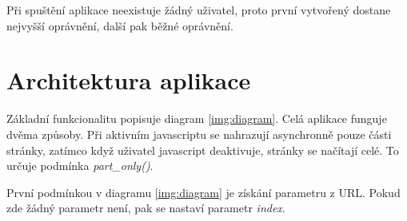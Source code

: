 \documentclass[a4paper]{article}
\begin{document}
		P\v{r}i spu\v{s}t\v{e}n\'i aplikace neexistuje \v{z}\'adn\'y u\v{z}ivatel, proto prvn\'i vytvo\v{r}en\'y
		dostane nejvy\v{s}\v{s}\'i opr\'avn\v{e}n\'i, dal\v{s}\'i pak b\v{e}\v{z}n\'e opr\'avn\v{e}n\'i.

		\clearpage
	\section{Architektura aplikace}
		Z\'akladn\'i funkcionalitu popisuje diagram \ref{img:diagram}. Cel\'a aplikace funguje dv\v{e}ma zp\r{u}\-so\-by.
		P\v{r}i aktivn\'im javascriptu se nahrazuj\'i asynchronn\v{e} pouze \v{c}\'asti str\'anky, zat\'imco kdy\v{z}
		u\v{z}ivatel javascript deaktivuje, str\'anky se na\v{c}\'itaj\'i cel\'e. To ur\v{c}uje podm\'inka
		\textit{part\_only()}.

		Prvn\'i podm\'inkou v diagramu \ref{img:diagram} je z\'isk\'an\'i parametru z URL. Pokud zde \v{z}\'adn\'y
		parametr nen\'i, pak se nastav\'i parametr \textit{index}.
\end{document}
